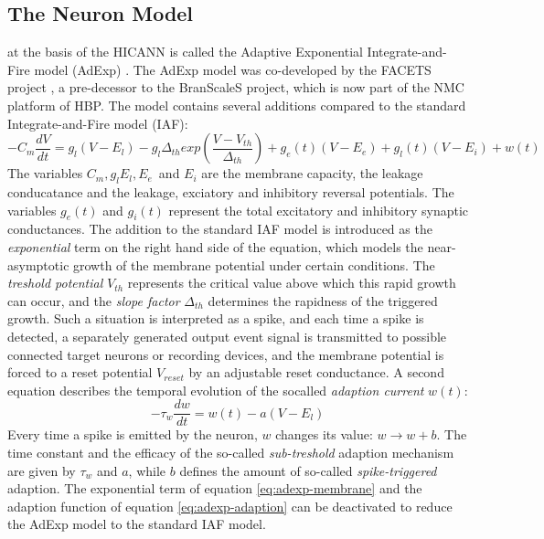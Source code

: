 \subsection{The Neuron Model}\label{sect:adexp} at the basis of the HICANN is called the Adaptive Exponential Integrate-and-Fire model (AdExp) \cite{brette_adaptive_2005}.
The AdExp model was co-developed by the FACETS project \cite{schemmel_wafer-scale_2010}, a pre-decessor to the BranScaleS project, which is now part of the NMC platform of HBP.
The model contains several additions compared to the standard Integrate-and-Fire model (IAF):
\begin{equation}\label{eq:adexp-membrane}
-C_m\frac{dV}{dt} = g_l(V-E_l) - g_l\Delta_{th}exp(\frac{V-V_{th}}{\Delta_{th}}) + g_e(t)(V-E_e)+g_l(t)(V-E_i)+w(t)
\end{equation}
The variables $C_m, g_l E_l, E_e$ and $E_i$ are the membrane capacity, the leakage conducatance and the leakage, exciatory and inhibitory reversal potentials.
The variables $g_e(t)$ and $g_i(t)$ represent the total excitatory and inhibitory synaptic conductances.
The addition to the standard IAF model is introduced as the \textit{exponential} term on the right hand side of the equation, which models the near-asymptotic growth of the membrane potential under certain conditions.
The \textit{treshold potential} $V_{th}$ represents the critical value above which this rapid growth can occur, and the \textit{slope factor} $\Delta_{th}$ determines the rapidness of the triggered growth.
Such a situation is interpreted as a spike, and each time a spike is detected, a separately generated output event signal is transmitted to possible connected target neurons or recording devices, and the membrane potential is forced to a reset potential $V_{reset}$ by an adjustable reset conductance.
A second equation describes the temporal evolution of the socalled \textit{adaption current} $w(t)$:
\begin{equation}\label{eq:adexp-adaption}
-\tau_{w}\frac{dw}{dt} = w(t) - a(V-E_l)
\end{equation}
Every time a spike is emitted by the neuron, $w$ changes its value: $w \rightarrow w + b$.
The time constant and the efficacy of the so-called \textit{sub-treshold} adaption mechanism are given by $\tau_w$ and $a$, while $b$ defines the amount of so-called \textit{spike-triggered} adaption.
The exponential term of equation \ref{eq:adexp-membrane} and the adaption function of equation \ref{eq:adexp-adaption} can be deactivated to reduce the AdExp model to the standard IAF model.
\cite{schemmel_wafer-scale_2010}\cite{brette_adaptive_2005}

